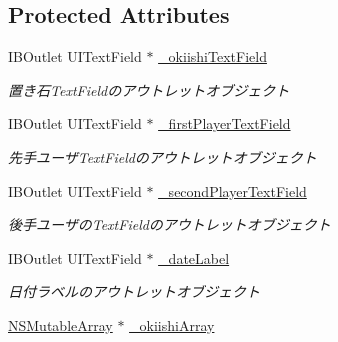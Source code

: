\subsection*{Protected Attributes}
\begin{DoxyCompactItemize}
\item 
\hypertarget{interface_normal_regist_view_controller_a1a88180881e1ccf00bb39768b7fc70a0}{
IBOutlet UITextField $\ast$ \hyperlink{interface_normal_regist_view_controller_a1a88180881e1ccf00bb39768b7fc70a0}{\_\-okiishiTextField}}
\label{interface_normal_regist_view_controller_a1a88180881e1ccf00bb39768b7fc70a0}

\begin{DoxyCompactList}\small\item\em 置き石TextFieldのアウトレットオブジェクト \end{DoxyCompactList}\item 
\hypertarget{interface_normal_regist_view_controller_a99eef76a4bc0d365393d98e2c7d54865}{
IBOutlet UITextField $\ast$ \hyperlink{interface_normal_regist_view_controller_a99eef76a4bc0d365393d98e2c7d54865}{\_\-firstPlayerTextField}}
\label{interface_normal_regist_view_controller_a99eef76a4bc0d365393d98e2c7d54865}

\begin{DoxyCompactList}\small\item\em 先手ユーザTextFieldのアウトレットオブジェクト \end{DoxyCompactList}\item 
\hypertarget{interface_normal_regist_view_controller_a6b96e064c9119e0e435137e93cc9d04f}{
IBOutlet UITextField $\ast$ \hyperlink{interface_normal_regist_view_controller_a6b96e064c9119e0e435137e93cc9d04f}{\_\-secondPlayerTextField}}
\label{interface_normal_regist_view_controller_a6b96e064c9119e0e435137e93cc9d04f}

\begin{DoxyCompactList}\small\item\em 後手ユーザのTextFieldのアウトレットオブジェクト \end{DoxyCompactList}\item 
\hypertarget{interface_normal_regist_view_controller_a7f0cd9cab9067ad9a17807f5d0bd09f4}{
IBOutlet UITextField $\ast$ \hyperlink{interface_normal_regist_view_controller_a7f0cd9cab9067ad9a17807f5d0bd09f4}{\_\-dateLabel}}
\label{interface_normal_regist_view_controller_a7f0cd9cab9067ad9a17807f5d0bd09f4}

\begin{DoxyCompactList}\small\item\em 日付ラベルのアウトレットオブジェクト \end{DoxyCompactList}\item 
\hypertarget{interface_normal_regist_view_controller_a7e7e1fec1ba71d4323ab09754d52e0a6}{
\hyperlink{class_n_s_mutable_array}{NSMutableArray} $\ast$ \hyperlink{interface_normal_regist_view_controller_a7e7e1fec1ba71d4323ab09754d52e0a6}{\_\-okiishiArray}}
\label{interface_normal_regist_view_controller_a7e7e1fec1ba71d4323ab09754d52e0a6}


\end{DoxyCompactItemize}
